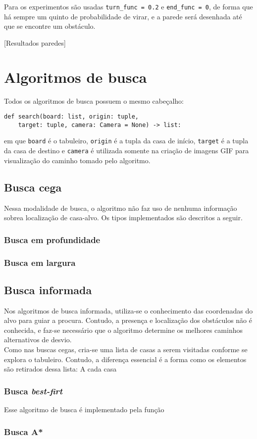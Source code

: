 \documentclass{article}
\begin{document}
Para os experimentos são usadas \verb|turn_func = 0.2| e \verb|end_func = 0|, de forma que há sempre um quinto de probabilidade de virar, e a parede será desenhada até que se encontre um obstáculo.

[Resultados paredes]

\section{Algoritmos de busca}
Todos os algoritmos de busca possuem o mesmo cabeçalho:

\begin{lstlisting}
def search(board: list, origin: tuple,
	target: tuple, camera: Camera = None) -> list:
\end{lstlisting}

em que \verb|board| é o tabuleiro, \verb|origin| é a tupla da casa de início, \verb|target| é a tupla da casa de destino e \verb|camera| é utilizada somente na criação de imagens GIF para visualização do caminho tomado pelo algoritmo.

\subsection{Busca cega}
Nessa modalidade de busca, o algoritmo não faz uso de nenhuma informação sobrea localização de casa-alvo. Os tipos implementados são descritos a seguir.
\subsubsection{Busca em profundidade}
\subsubsection{Busca em largura}

\subsection{Busca informada}
Nos algoritmos de busca informada, utiliza-se o conhecimento das coordenadas do alvo para guiar a procura. Contudo, a presença e localização dos obstáculos não é conhecida, e faz-se necessário que o algoritmo determine os melhores caminhos alternativos de desvio.\\

Como nas buscas cegas, cria-se uma lista de casas a serem visitadas conforme se explora o tabuleiro. Contudo, a diferença essencial é a forma como os elementos são retirados dessa lista: A cada casa 
\subsubsection{Busca \emph{best-firt}}

Esse algoritmo de busca é implementado pela função

\subsubsection{Busca A*}
\end{document}
